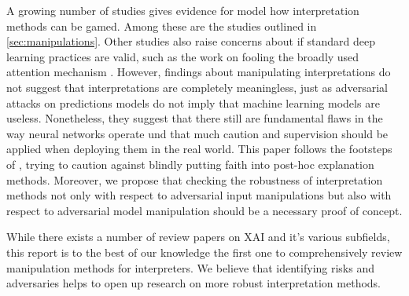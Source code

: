 A growing number of studies gives evidence for model how interpretation methods can be gamed. Among these are the studies outlined in \autoref{sec:manipulations}. Other studies also raise concerns about if standard deep learning practices are valid, such as the work on fooling the broadly used attention mechanism \cite{jain2019attention}.
However, findings about manipulating interpretations do not suggest that interpretations are completely meaningless, just as adversarial attacks on predictions models do not imply that machine learning models are useless. Nonetheless, they suggest that there still are fundamental flaws in the way neural networks operate und that much caution and supervision should be applied when deploying them in the real world. 
This paper follows the footsteps of \cite{lipton2018mythos}, trying to caution against blindly putting faith into post-hoc explanation methods. Moreover, we propose that checking the robustness of interpretation methods not only with respect to adversarial input manipulations but also with respect to adversarial model manipulation should be a necessary proof of concept. 


While there exists a number of review papers on XAI and it's various subfields, this report is to the best of our knowledge the first one to comprehensively review manipulation methods for interpreters. 
We believe that identifying risks and adversaries helps to open up research on more robust interpretation methods. 





